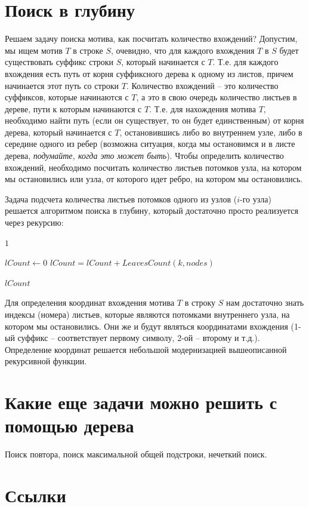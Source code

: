 \documentclass[letterpaper, 11pt]{article}
\begin{document}
\section{Поиск в глубину}
\par
Решаем задачу поиска мотива, как посчитать количество вхождений? Допустим, мы ищем мотив $T$ в строке $S$, очевидно, что для каждого вхождения $T$ в $S$ будет существовать суффикс строки $S$, который начинается с $T$. Т.е. для каждого вхождения есть путь от корня суффиксного дерева к одному из листов, причем начинается этот путь со строки $T$. Количество вхождений -- это количество суффиксов, которые начинаются с $T$, а это в свою очередь количество листьев в дереве, пути к которым начинаются с $T$. Т.е. для нахождения мотива $T$, необходимо найти путь (если он существует, то он будет единственным) от корня дерева, который начинается с $T$, остановившись либо во внутреннем узле, либо в середине одного из ребер (возможна ситуация, когда мы остановимся и в листе дерева, \textit{подумайте, когда это может быть}). Чтобы определить количество вхождений, необходимо посчитать количество листьев потомков узла, на котором мы остановились или узла, от которого идет ребро, на котором мы остановились.

Задача подсчета количества листьев потомков одного из узлов ($i$-го узла) решается алгоритмом поиска в глубину, который достаточно просто реализуется через рекурсию:

\begin{algorithmic}[1]
\State \Return $1$
\EndIf
\item[]
\State $lCount \gets 0$
\State $lCount = lCount + LeavesCount(k, nodes)$
\EndFor
\item[]
\State \Return $lCount$
\EndProcedure
\end{algorithmic}

Для определения координат вхождения мотива $T$ в строку $S$ нам достаточно знать индексы (номера) листьев, которые являются потомками внутреннего узла, на котором мы остановились. Они же и будут являться координатами вхождения (1-ый суффикс -- соответствует первому символу, 2-ой -- второму и т.д.). Определение координат решается небольшой модернизацией вышеописанной рекурсивной функции.

\section{Какие еще задачи можно решить с помощью дерева}
\par
Поиск повтора, поиск максимальной общей подстроки, нечеткий поиск.

\section{Ссылки}

\begingroup
\renewcommand{\section}[2]{}%
\begin{thebibliography}{7}


\end{thebibliography}
\endgroup
\end{document}
